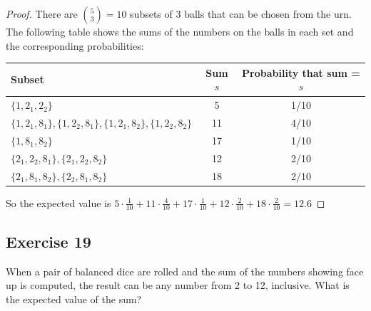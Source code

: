 \documentclass[14pt]{extarticle}
\begin{document}
\begin{proof}
There are \(\binom{5}{3} = 10\) subsets of 3 balls that can be chosen from the urn. The following table shows the sums of the 
numbers on the balls in each set and the corresponding probabilities:
\begin{center}
\begin{tabular}{|l|c|c|}
\hline
{\bf Subset} & {\bf Sum \(s\)} & {\bf Probability that sum = \(s\)} \\
\hline
\(\{1, 2_1, 2_2\}\) & 5 & 1/10 \\
\hline
\(\{1,2_1,8_1\}, \{1,2_2,8_1\}, \{1,2_1,8_2\}, \{1,2_2,8_2\}\) & 11 & 4/10 \\
\hline
\(\{1,8_1,8_2\}\) & 17 & 1/10 \\
\hline
\(\{2_1,2_2,8_1\}, \{2_1,2_2,8_2\}\) & 12 & 2/10 \\
\hline
\(\{2_1,8_1,8_2\}, \{2_2,8_1,8_2\}\) & 18 & 2/10 \\
\hline
\end{tabular}
\end{center}
So the expected value is \(5 \cdot \frac{1}{10} + 11 \cdot \frac{4}{10} + 17 \cdot \frac{1}{10} + 12 \cdot \frac{2}{10} + 
18 \cdot \frac{2}{10} = 12.6\)
\end{proof}

\subsection{Exercise 19}
When a pair of balanced dice are rolled and the sum of the numbers showing face up is computed, the result can be any 
number from 2 to 12, inclusive. What is the expected value of the sum?
\end{document}
